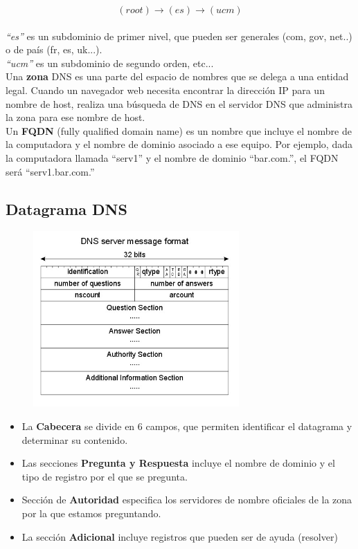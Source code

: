 \[(root) \rightarrow (es) \rightarrow (ucm)\]\\
\textit{\enquote{es}} es un subdominio de primer nivel, que pueden ser generales (com, gov, net..) o de país (fr, es, uk...).\\

\textit{\enquote{ucm}} es un subdominio de segundo orden, etc...\\

Una \textbf{zona} DNS es una parte del espacio de nombres que se delega a una entidad legal. Cuando un navegador web necesita encontrar la dirección IP para un nombre de host, realiza una búsqueda de DNS en el servidor DNS que administra la zona para ese nombre de host.\\

Un \textbf{FQDN} (fully qualified domain name) es un nombre que incluye el nombre de la computadora y el nombre de dominio asociado a ese equipo. Por ejemplo, dada la computadora llamada \enquote{serv1} y el nombre de dominio \enquote{bar.com.}, el FQDN será \enquote{serv1.bar.com.}
\newpage
\subsection{Datagrama DNS}
\begin{figure}[H]\centering\includegraphics[width=0.7\textwidth]{img/DNS_Datagram.jpg}
\end{figure}
\begin{itemize}
    \item La \textbf{Cabecera} se divide en 6 campos, que permiten identificar el datagrama y determinar su contenido.
    \item Las secciones \textbf{Pregunta y Respuesta} incluye el nombre de dominio y el tipo de registro por el que se pregunta.
    \item Sección de \textbf{Autoridad} especifica los servidores de nombre oficiales de la zona por la que estamos preguntando.
    \item La sección \textbf{Adicional} incluye registros que pueden ser de ayuda (resolver)
\end{itemize}
